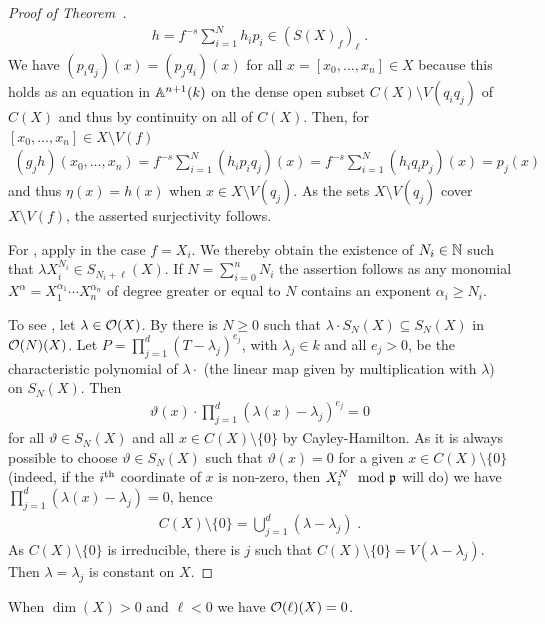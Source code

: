 \documentclass[a4paper,parskip=half,numbers=enddot, DIV=12]{scrreprt}
\begin{document}
\begin{proof}[Proof of Theorem~]
    \begin{align*}
    	h= f^{-s}\sum_{i=1}^N h_ip_i\in (S(X)_f)_\ell\;.
    \end{align*}
    We have $(p_i q_j)(x) = (p_jq_i)(x)$ for all $x=[x_0,\ldots,x_n]\in X$ because this holds as an equation in $\mathbb{A}^{n+1}(k)$ on the dense open subset $C(X)\setminus V(q_iq_j)$ of $C(X)$ and thus by continuity on all of $C(X)$. Then, for $[x_0,\ldots, x_n]\in X\setminus V(f)$ 
    \begin{align*}
        (g_jh)(x_0,\ldots, x_n) = f^{-s}\sum_{i=1}^N (h_ip_iq_j)(x)= f^{-s}\sum_{i=1}^N (h_iq_ip_j)(x) = p_j(x)
    \end{align*}
    and thus $\eta(x) = h(x)$ when $x\in X\setminus V(q_j)$. As the sets $X\setminus V(q_j)$ cover $X\setminus V(f)$, the asserted surjectivity follows.
    
    For , apply  in the case $f=X_i$. We thereby obtain the existence of $N_i\in\mathbb{N}$ such that $\lambda X_i^{N_i}\in S_{N_i+\ell}(X)$. If $N = \sum_{i=0}^n N_i$ the assertion follows as any monomial $X^\alpha=X_1^{\alpha_1}\cdots X_n^{\alpha_n}$ of degree greater or equal to $N$ contains an exponent $\alpha_i\geq N_i$.
    
    To see , let $\lambda\in \mathcal{O}(X)$. By  there is $N\geq 0$ such that $\lambda\cdot S_N(X) \subseteq S_N(X)$ in $\mathcal{O}(N)(X)$. Let $P = \prod_{j=1}^d (T-\lambda_j)^{e_j}$, with $\lambda_j\in k$ and all $e_j>0$, be the characteristic polynomial of $\lambda\cdot$ (the linear map given by multiplication with $\lambda$) on $S_N(X)$. Then 
    \begin{align*}
    	 \vartheta(x)\cdot\prod_{j=1}^d (\lambda(x)-\lambda_j)^{e_j} = 0
    \end{align*}
   for all $\vartheta\in S_N(X)$ and all $x\in C(X)\setminus \{0\}$ by Cayley-Hamilton. As it is always possible to choose $\vartheta\in S_N(X)$ such that $\vartheta(x)=0$ for a given $x\in C(X)\setminus\{0\}$ (indeed, if the $i^{\text{th}}$ coordinate of $x$ is non-zero, then $X_i^N\mod{\mathfrak{p}}$ will do) we have $\prod_{j=1}^d (\lambda(x)-\lambda_j) = 0$, hence 
   \begin{align*}
   	C(X)\setminus \{0\} = \bigcup_{j=1}^d (\lambda-\lambda_j)\;. 
   \end{align*}
   As $C(X)\setminus \{0\}$ is irreducible, there is $j$ such that $C(X)\setminus\{0\} = V(\lambda-\lambda_j)$. Then $\lambda=\lambda_j$ is constant on $X$. 
\end{proof}
\begin{cor}
    When $\dim(X) >0$ and $\ell<0$ we have $\mathcal{O}(\ell)(X) = 0$.
\end{cor}
\end{document}
